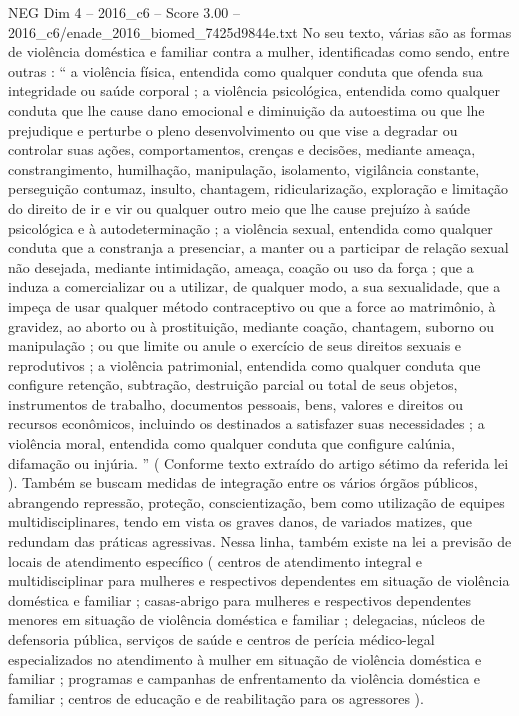 \begin{textsample}{NEG Dim 4 – 2016\_c6 – Score 3.00 – 2016\_c6/enade\_2016\_biomed\_7425d9844e.txt}
No seu texto, várias são as formas de violência doméstica e familiar contra a mulher, identificadas como sendo, entre outras : “ a violência física, entendida como qualquer conduta que ofenda sua integridade ou saúde corporal ; a violência psicológica, entendida como qualquer conduta que lhe cause dano emocional e diminuição da autoestima ou que lhe prejudique e perturbe o pleno desenvolvimento ou que vise a degradar ou controlar suas ações, comportamentos, crenças e decisões, mediante ameaça, constrangimento, humilhação, manipulação, isolamento, vigilância constante, perseguição contumaz, insulto, chantagem, ridicularização, exploração e limitação do direito de ir e vir ou qualquer outro meio que lhe cause prejuízo à saúde psicológica e à autodeterminação ; a violência sexual, entendida como qualquer conduta que a constranja a presenciar, a manter ou a participar de relação sexual não desejada, mediante intimidação, ameaça, coação ou uso da força ; que a induza a comercializar ou a utilizar, de qualquer modo, a sua sexualidade, que a impeça de usar qualquer método contraceptivo ou que a force ao matrimônio, à gravidez, ao aborto ou à prostituição, mediante coação, chantagem, suborno ou manipulação ; ou que limite ou anule o exercício de seus direitos sexuais e reprodutivos ; a violência patrimonial, entendida como qualquer conduta que configure retenção, subtração, destruição parcial ou total de seus objetos, instrumentos de trabalho, documentos pessoais, bens, valores e direitos ou recursos econômicos, incluindo os destinados a satisfazer suas necessidades ; a violência moral, entendida como qualquer conduta que configure calúnia, difamação ou injúria. ” ( Conforme texto extraído do artigo sétimo da referida lei ).
Também se buscam medidas de integração entre os vários órgãos públicos, abrangendo repressão, proteção, conscientização, bem como utilização de equipes multidisciplinares, tendo em vista os graves danos, de variados matizes, que redundam das práticas agressivas.
Nessa linha, também existe na lei a previsão de locais de atendimento específico ( centros de atendimento integral e multidisciplinar para mulheres e respectivos dependentes em situação de violência doméstica e familiar ; casas-abrigo para mulheres e respectivos dependentes menores em situação de violência doméstica e familiar ; delegacias, núcleos de defensoria pública, serviços de saúde e centros de perícia médico-legal especializados no atendimento à mulher em situação de violência doméstica e familiar ; programas e campanhas de enfrentamento da violência doméstica e familiar ; centros de educação e de reabilitação para os agressores ).

\end{textsample}
